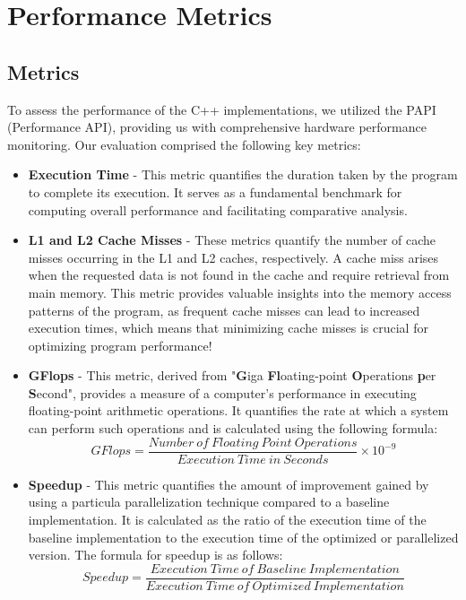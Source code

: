 \section{Performance Metrics}

\subsection{Metrics}
To assess the performance of the C++ implementations, we 
utilized the PAPI (Performance API), providing us with comprehensive 
hardware performance monitoring. Our evaluation comprised the 
following key metrics:

\begin{itemize}
\item \textbf{Execution Time} - This metric quantifies the 
duration taken by the program to 
complete its execution. It serves as a fundamental 
benchmark for computing overall performance 
and facilitating comparative analysis.

\item \textbf{L1 and L2 Cache Misses} - These metrics 
quantify the number of cache misses occurring in the 
L1 and L2 caches, respectively. A cache miss arises 
when the requested data is not found in the cache and 
require retrieval from main memory. This metric 
provides valuable insights into the memory access patterns
of the program, as frequent cache misses can lead to 
increased execution times, which means that 
minimizing cache misses is crucial for optimizing 
program performance!

\item \textbf{GFlops} - This metric, derived from "\textbf{G}iga 
\textbf{Fl}oating-point \textbf{O}perations \textbf{p}er \textbf{S}econd", provides a measure of a 
computer's performance in executing floating-point arithmetic 
operations. It quantifies the rate at which a system can 
perform such operations and is calculated using the following formula:
    \begin{equation}
        GFlops = \frac{Number\ of\ Floating\ Point\ Operations}{Execution\ Time\ in\ Seconds} \times 10^{-9}
    \end{equation}

\item \textbf{Speedup} - This metric quantifies the 
amount of improvement gained by using a particula 
parallelization technique compared to a baseline
implementation. It is calculated as the ratio of
the execution time of the baseline implementation
to the execution time of the optimized or parallelized
version. The formula for speedup is as follows:
    \begin{equation}
        Speedup = \frac{Execution\ Time\ of\ Baseline\ Implementation}{Execution\ Time\ of\ Optimized\ Implementation}
    \end{equation}



\end{itemize}
